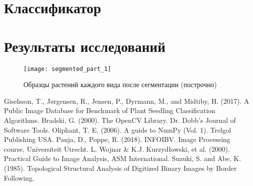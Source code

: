 \documentclass[12pt]{article}
\begin{document}
\section{Классификатор}

\section{Результаты исследований}
\begin{figure}[h!]
	\centering
	\texttt{[image: segmented\_part\_1]}
	\caption{Образцы растений каждого вида после сегментации (построчно)}
	\label{fig_iwf}
\end{figure}
\newpage

\begin{thebibliography}{}
	 Giselsson, T., Jørgensen, R., Jensen, P., Dyrmann, M., and Midtiby, H. (2017). A Public Image Database for Benchmark of Plant Seedling Classification Algorithms. 
	 Bradski, G. (2000). The OpenCV Library. Dr. Dobb's Journal of Software Tools.
	 Oliphant, T. E. (2006). A guide to NumPy (Vol. 1). Trelgol Publishing USA.
	 Panja, D., Poppe, R. (2018). INFOIBV. Image Processing course, Universiteit Utrecht.
	 L. Wojnar \& K.J. Kurzydłowski, et al. (2000). Practical Guide to Image Analysis, ASM International.
	 Suzuki, S. and Abe, K. (1985). Topological Structural Analysis of Digitized Binary Images by Border Following.
\end{thebibliography}
\end{document}
